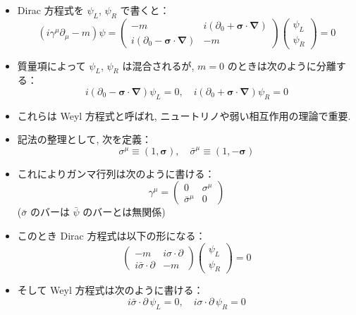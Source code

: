 \documentclass[a4paper,12pt]{article}
\begin{document}
\begin{itemize}
    \item Dirac 方程式を $\psi_L$, $\psi_R$ で書くと：
    \begin{equation*}
    (i \gamma^\mu \partial_\mu - m)\psi =
    \begin{pmatrix}
    -m & i(\partial_0 + \boldsymbol{\sigma} \cdot \boldsymbol{\nabla}) \\
    i(\partial_0 - \boldsymbol{\sigma} \cdot \boldsymbol{\nabla}) & -m
    \end{pmatrix}
    \begin{pmatrix}
    \psi_L \\ \psi_R
    \end{pmatrix} = 0 \tag{3.39}
    \end{equation*}
    \item 質量項によって $\psi_L$, $\psi_R$ は混合されるが, $m = 0$ のときは次のように分離する：
    \begin{equation*}
    i(\partial_0 - \boldsymbol{\sigma} \cdot \boldsymbol{\nabla})\psi_L = 0, \quad
    i(\partial_0 + \boldsymbol{\sigma} \cdot \boldsymbol{\nabla})\psi_R = 0 \tag{3.40}
    \end{equation*}
    \item これらは Weyl 方程式と呼ばれ, ニュートリノや弱い相互作用の理論で重要.
    
    \item 記法の整理として, 次を定義：
    \begin{equation*}
    \sigma^\mu \equiv (1, \boldsymbol{\sigma}), \quad
    \bar{\sigma}^\mu \equiv (1, -\boldsymbol{\sigma}) \tag{3.41}
    \end{equation*}
    \item これによりガンマ行列は次のように書ける：
    \begin{equation*}
    \gamma^\mu =
    \begin{pmatrix}
    0 & \sigma^\mu \\
    \bar{\sigma}^\mu & 0
    \end{pmatrix} \tag{3.42}
    \end{equation*}
    ($\bar{\sigma}$ のバーは $\bar{\psi}$ のバーとは無関係)
  
    \item このとき Dirac 方程式は以下の形になる：
    \begin{equation*}
    \begin{pmatrix}
    -m & i \sigma \cdot \partial \\
    i \bar{\sigma} \cdot \partial & -m
    \end{pmatrix}
    \begin{pmatrix}
    \psi_L \\ \psi_R
    \end{pmatrix} = 0 \tag{3.43}
    \end{equation*}
    \item そして Weyl 方程式は次のように書ける：
    \begin{equation*}
    i \bar{\sigma} \cdot \partial \, \psi_L = 0, \quad
    i \sigma \cdot \partial \, \psi_R = 0 \tag{3.44}
    \end{equation*}
  \end{itemize}
\end{document}
